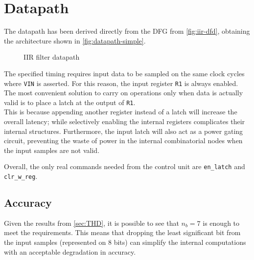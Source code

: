 \section{Datapath}
The datapath has been derived directly from the DFG from \autoref{fig:iir-dfd}, obtaining the architecture shown in \autoref{fig:datapath-simple}.

\begin{figure}[htbp]
	\centering
	\caption{IIR filter datapath}
	\label{fig:datapath-simple}
\end{figure}

The specified timing requires input data to be sampled on the same clock cycles where \texttt{VIN} is asserted. For this reason, the input register \texttt{R1} is always enabled. The most convenient solution to carry on operations only when data is actually valid is to place a latch at the output of \texttt{R1}.\\
This is because appending another register instead of a latch will increase the overall latency; while selectively enabling the internal registers complicates their internal structures. Furthermore, the input latch will also act as a power gating circuit, preventing the waste of power in the internal combinatorial nodes when the input samples are not valid.

Overall, the only real commands needed from the control unit are \texttt{en\_latch} and \texttt{clr\_w\_reg}.

\subsection{Accuracy}
Given the results from \autoref{sec:THD}, it is possible to see that $n_b=7$ is enough to meet the requirements. This means that dropping the least significant bit from the input samples (represented on 8 bits) can simplify the internal computations with an acceptable degradation in accuracy.

